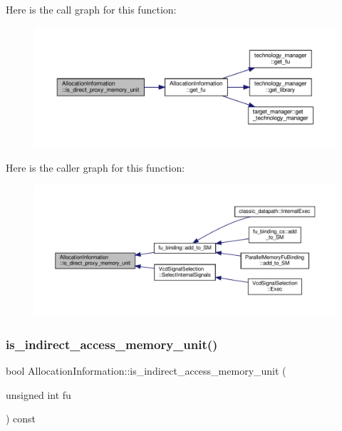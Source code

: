 Here is the call graph for this function\+:
\nopagebreak
\begin{figure}[H]
\begin{center}
\leavevmode
\includegraphics[width=350pt]{d7/d79/classAllocationInformation_a7318ac7290c6ddc8f871c98d8817c5c9_cgraph}
\end{center}
\end{figure}
Here is the caller graph for this function\+:
\nopagebreak
\begin{figure}[H]
\begin{center}
\leavevmode
\includegraphics[width=350pt]{d7/d79/classAllocationInformation_a7318ac7290c6ddc8f871c98d8817c5c9_icgraph}
\end{center}
\end{figure}
\mbox{\label{classAllocationInformation_a78857c97df2c595abff1d03c6a6c3a87}} 
\subsubsection{\texorpdfstring{is\+\_\+indirect\+\_\+access\+\_\+memory\+\_\+unit()}{is\_indirect\_access\_memory\_unit()}}
{\footnotesize\ttfamily bool Allocation\+Information\+::is\+\_\+indirect\+\_\+access\+\_\+memory\+\_\+unit (\begin{DoxyParamCaption}\item[{unsigned int}]{fu }\end{DoxyParamCaption}) const}



